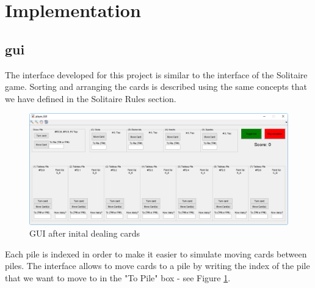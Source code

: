 \documentclass[runningheads,a4paper]{llncs}
\begin{document}
\section{Implementation}
\label{sec:gui_init}
\subsection{\ac{gui}}
The interface developed for this project is similar to the interface of the Solitaire game.
Sorting and arranging the cards is described using the same concepts that we have defined in the Solitaire Rules section.
\begin{figure}
	\begin{center}
		\includegraphics[width=\textwidth]{images/dealinit}
		\caption{GUI after inital dealing cards}
		\label{fig:gui_init}
	\end{center}
\end{figure}
\newline

Each pile is indexed in order to make it easier to simulate moving cards between piles. The interface allows to move cards to a pile by writing the index of the pile that we want to move to in the "To Pile" box - see Figure \ref{fig:gui_init}.
\newline
\end{document}

